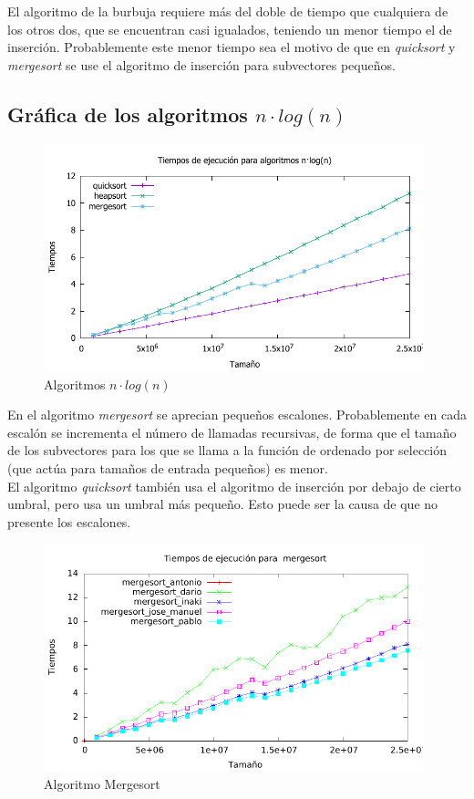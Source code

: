 \documentclass[a4paper, 11pt]{article}
\begin{document}
El algoritmo de la burbuja requiere más del doble de tiempo que cualquiera de los otros dos, que se encuentran casi igualados, teniendo un menor tiempo el de inserción. Probablemente este menor tiempo sea el motivo de que en \textit{quicksort} y \textit{mergesort} se use el algoritmo de inserción para subvectores pequeños.

\subsection{Gráfica de los algoritmos $n\cdot log(n)$ }
\begin{figure}[h] \includegraphics[width=11cm]{comparativa_logaritmicos_g} \centering
	\caption{Algoritmos  $n\cdot log(n)$} \end{figure}

En el algoritmo \textit{mergesort} se aprecian pequeños escalones. Probablemente en cada escalón se incrementa el número de llamadas recursivas, de forma que el tamaño de los subvectores para los que se llama a la función de ordenado por selección (que actúa para tamaños de entrada pequeños) es menor. \\
El algoritmo \textit{quicksort} también usa el algoritmo de inserción por debajo de cierto umbral, pero usa un umbral más pequeño. Esto puede ser la causa de que no presente los escalones.

\begin{figure}[h] \includegraphics[width=11cm]{mergesort_todos_g} \centering
   \caption{Algoritmo Mergesort} \end{figure}
\end{document}
